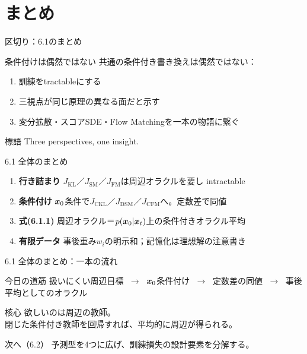 \section{まとめ}
\asmain
\begin{frame}{区切り：6.1のまとめ}
    \tableofcontents[currentsection]
\end{frame}
\asmain
\begin{frame}{条件付けは偶然ではない}
    共通の条件付き書き換えは偶然ではない：
    \begin{enumerate}
        \item 訓練をtractableにする
        \item 三視点が同じ原理の異なる面だと示す
        \item 変分拡散・スコアSDE・Flow Matchingを一本の物語に繋ぐ
    \end{enumerate}
    \begin{block}{標語}
        Three perspectives, one insight.
    \end{block}
\end{frame}
\asmain
\begin{frame}{6.1 全体のまとめ}
    \begin{enumerate}
        \item \textbf{行き詰まり}
        $J_{\mathrm{KL}}$／$J_{\mathrm{SM}}$／$J_{\mathrm{FM}}$は周辺オラクルを要し intractable
        \item \textbf{条件付け}
        $\bm{x}_0$条件で$J_{\mathrm{CKL}}$／$J_{\mathrm{DSM}}$／$J_{\mathrm{CFM}}$へ。定数差で同値
        \item \textbf{式(6.1.1)}
        周辺オラクル＝$p(\bm{x}_0|\bm{x}_t)$上の条件付きオラクル平均
        \item \textbf{有限データ}
        事後重み$w_i$の明示和；記憶化は理想解の注意書き
    \end{enumerate}
\end{frame}
\asmain
\begin{frame}{6.1 全体のまとめ：一本の流れ}
    \begin{block}{今日の道筋}
        扱いにくい周辺目標
        $\;\to\;$
        $\bm{x}_0$条件付け
        $\;\to\;$
        定数差の同値
        $\;\to\;$
        事後平均としてのオラクル
    \end{block}
    \begin{block}{核心}
        欲しいのは周辺の教師。\\
        閉じた条件付き教師を回帰すれば、平均的に周辺が得られる。
    \end{block}
    \begin{block}{次へ（6.2）}
        予測型を4つに広げ、訓練損失の設計要素を分解する。
    \end{block}
\end{frame}
